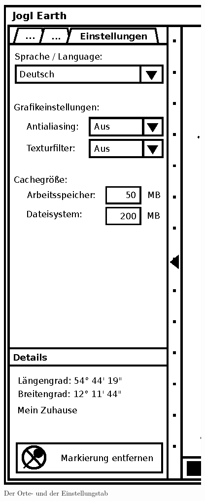 \documentclass[10pt]{scrreprt}
\begin{document}
\begin{figure}
\begin{minipage}[c]{6cm}
        \centering
                \includegraphics[scale=0.9]{GUI-Einstellungen.eps}
        \end{minipage}
        \caption{Der Orte- und der Einstellungstab}
\end{figure}
\end{document}

